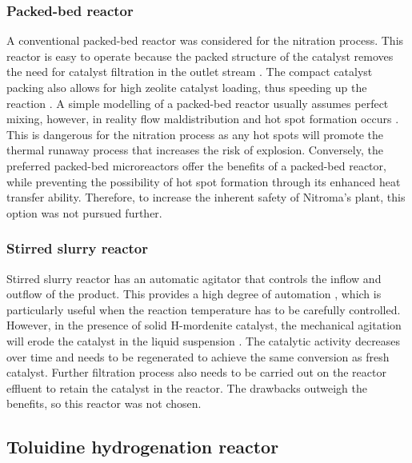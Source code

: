 \subsubsection{Packed-bed reactor}
A conventional packed-bed reactor was considered for the nitration process. This reactor is easy to operate because the packed structure of the catalyst removes the need for catalyst filtration in the outlet stream . The compact catalyst packing also allows for high zeolite catalyst loading, thus speeding up the reaction \cite{kashid_microstructured_2009}. A simple modelling of a packed-bed reactor usually assumes perfect mixing, however, in reality flow maldistribution and hot spot formation occurs \cite{nguyen_flow_1994}. This is dangerous for the nitration process as any hot spots will promote the thermal runaway process that increases the risk of explosion. Conversely, the preferred packed-bed microreactors offer the benefits of a packed-bed reactor, while preventing the possibility of hot spot formation through its enhanced heat transfer ability. Therefore, to increase the inherent safety of Nitroma's plant, this option was not pursued further.

\subsubsection{Stirred slurry reactor}
Stirred slurry reactor has an automatic agitator that controls the inflow and outflow of the product. This provides a high degree of automation \cite{liu_nitration_2019}, which is particularly useful when the reaction temperature has to be carefully controlled. However, in the presence of solid H-mordenite catalyst, the mechanical agitation will erode the catalyst in the liquid suspension \cite{argyle_heterogeneous_2015}. The catalytic activity decreases over time and needs to be regenerated to achieve the same conversion as fresh catalyst. Further filtration process also needs to be carried out on the reactor effluent to retain the catalyst in the reactor. The drawbacks outweigh the benefits, so this reactor was not chosen.

\subsection{Toluidine hydrogenation reactor}

